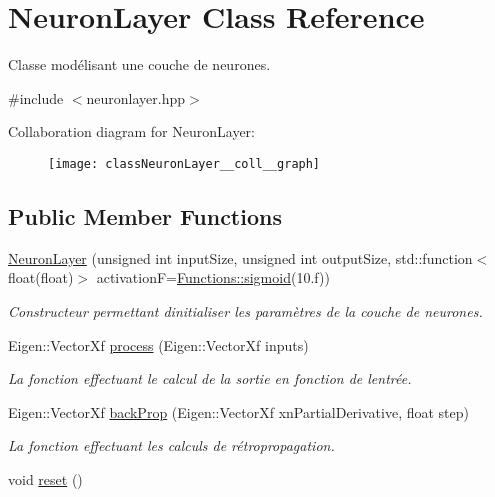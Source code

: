 \hypertarget{classNeuronLayer}{}\section{Neuron\+Layer Class Reference}
\label{classNeuronLayer}


Classe modélisant une couche de neurones.  




{\ttfamily \#include $<$neuronlayer.\+hpp$>$}



Collaboration diagram for Neuron\+Layer\+:\nopagebreak
\begin{figure}[H]
\begin{center}
\leavevmode
\texttt{[image: classNeuronLayer\_\_coll\_\_graph]}
\end{center}
\end{figure}
\subsection*{Public Member Functions}
\begin{DoxyCompactItemize}
\item 
\hyperlink{classNeuronLayer_afe2804871685b8103d7cd461460e7b31}{Neuron\+Layer} (unsigned int input\+Size, unsigned int output\+Size, std\+::function$<$ float(float)$>$ activationF=\hyperlink{structFunctions_a773de9cd59f7ccc3e2fe9822f0536ae4}{Functions\+::sigmoid}(10.f))
\begin{DoxyCompactList}\small\item\em Constructeur permettant d\textquotesingle{}initialiser les paramètres de la couche de neurones. \end{DoxyCompactList}\item 
Eigen\+::\+Vector\+Xf \hyperlink{classNeuronLayer_aa374ba7d040ae618b5037aa88e5efae7}{process} (Eigen\+::\+Vector\+Xf inputs)
\begin{DoxyCompactList}\small\item\em La fonction effectuant le calcul de la sortie en fonction de l\textquotesingle{}entrée. \end{DoxyCompactList}\item 
Eigen\+::\+Vector\+Xf \hyperlink{classNeuronLayer_a0896580aa265681f77efbcb81c6c8150}{back\+Prop} (Eigen\+::\+Vector\+Xf xn\+Partial\+Derivative, float step)
\begin{DoxyCompactList}\small\item\em La fonction effectuant les calculs de rétropropagation. \end{DoxyCompactList}\item 
void \hyperlink{classNeuronLayer_af4f8a2ea263ab0c242124571db916d73}{reset} ()
\end{DoxyCompactItemize}
